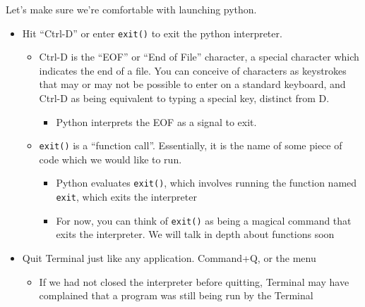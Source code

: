 Let's make sure we're comfortable with launching python.
\begin{itemize}
    \item Hit ``Ctrl-D'' or enter \texttt{exit()} to exit the python interpreter.
    \begin{itemize}
        \item Ctrl-D is the ``EOF'' or ``End of File'' character, a special character which indicates the end of a file.
            You can conceive of characters as keystrokes that may or may not be possible to enter on a standard keyboard, and Ctrl-D as being equivalent to typing a special key, distinct from D.
        \begin{itemize}
            \item Python interprets the EOF as a signal to exit.
        \end{itemize}
    \item \texttt{exit()} is a ``function call''. Essentially, it is the name of some piece of code which we would like to run.
        \begin{itemize}
            \item Python evaluates \texttt{exit()}, which involves running the function named \texttt{exit}, which exits the interpreter
            \item For now, you can think of \texttt{exit()} as being a magical command that exits the interpreter. We will talk in depth about functions soon
        \end{itemize}
    \end{itemize}
    \item Quit Terminal just like any application. Command+Q, or the menu
    \begin{itemize}
        \item If we had not closed the interpreter before quitting, Terminal may have complained that a program was still being run by the Terminal
    \end{itemize}
\end{itemize}
